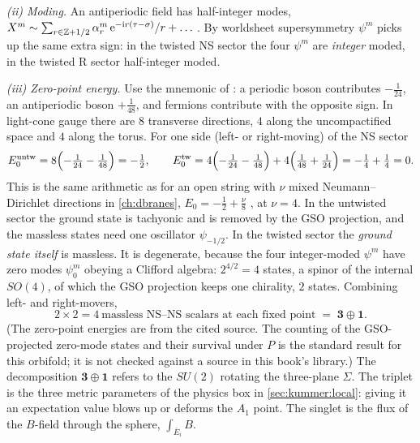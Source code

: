 \emph{(ii) Moding.} An antiperiodic field has half-integer modes,
$X^m\sim\sum_{r\in\mathbb{Z}+1/2}\alpha^m_r\,\mathrm{e}^{-\mathrm{i} r(\tau-\sigma)}/r+\dots$\,. By worldsheet
supersymmetry $\psi^m$ picks up the same extra sign: in the twisted NS sector the four
$\psi^m$ are \emph{integer} moded, in the twisted R sector half-integer moded.

\emph{(iii) Zero-point energy.} Use the mnemonic of : a periodic
boson contributes $-\frac1{24}$, an antiperiodic boson $+\frac1{48}$, and fermions
contribute with the opposite sign. In light-cone gauge there are $8$ transverse directions,
$4$ along the uncompactified space and $4$ along the torus. For one side (left- or
right-moving) of the NS sector
\begin{equation}\label{eq:kummer:E0}
  E_0^{\text{untw}}=8\Bigl(-\tfrac1{24}-\tfrac1{48}\Bigr)=-\tfrac12,\qquad
  E_0^{\text{tw}}=4\Bigl(-\tfrac1{24}-\tfrac1{48}\Bigr)+4\Bigl(\tfrac1{48}+\tfrac1{24}\Bigr)
  =-\tfrac14+\tfrac14=0 .
\end{equation}
This is the same arithmetic as for an open string with $\nu$ mixed Neumann--Dirichlet
directions in \cref{ch:dbranes}, $E_0=-\frac12+\frac\nu8$ , at $\nu=4$. In the untwisted sector the ground state is tachyonic and is
removed by the GSO projection, and the massless states need one oscillator $\psi_{-1/2}$. In
the twisted sector the \emph{ground state itself} is massless. It is degenerate, because the
four integer-moded $\psi^m$ have zero modes $\psi^m_0$ obeying a Clifford algebra: $2^{4/2}=4$
states, a spinor of the internal $SO(4)$, of which the GSO projection keeps one chirality,
$2$ states. Combining left- and right-movers,
\begin{equation}\label{eq:kummer:4scalars}
  2\times2=4\ \text{massless NS--NS scalars at each fixed point}\;=\;\mathbf 3\oplus\mathbf 1 .
\end{equation}
(The zero-point energies are from the cited source. The counting of the GSO-projected
zero-mode states and their survival under $P$ is the standard result for this orbifold; it
is not checked against a source in this book's library.) The decomposition
$\mathbf3\oplus\mathbf1$ refers to the $SU(2)$ rotating the three-plane $\Sigma$. The triplet
is the three metric parameters of the physics box in \cref{sec:kummer:local}: giving it an
expectation value blows up or deforms the $A_1$ point. The singlet is the flux of the
$B$-field through the sphere, $\int_{\bar E_i}B$.

